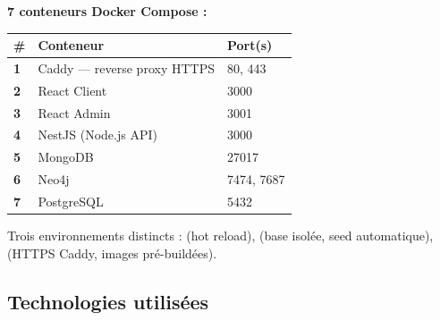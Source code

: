 \documentclass[12pt,a4paper]{article}
\begin{document}
\vspace{6pt}

\textbf{7 conteneurs Docker Compose :}

\vspace{4pt}
\begin{center}
    \renewcommand{\arraystretch}{1.4}
    \begin{tabularx}{\linewidth}{>{\bfseries}l X l}
        \textbf{\#} & \textbf{Conteneur}          & \textbf{Port(s)} \\
        \midrule
        \rowcolor{rowalt}
        1           & Caddy — reverse proxy HTTPS & 80, 443          \\
        2           & React Client                & 3000             \\
        \rowcolor{rowalt}
        3           & React Admin                 & 3001             \\
        4           & NestJS (Node.js API)        & 3000             \\
        \rowcolor{rowalt}
        5           & MongoDB                     & 27017            \\
        6           & Neo4j                       & 7474, 7687       \\
        \rowcolor{rowalt}
        7           & PostgreSQL                  & 5432             \\
    \end{tabularx}
\end{center}

\vspace{4pt}

Trois environnements distincts :  (hot reload),  (base isolée,
seed automatique),  (HTTPS Caddy, images pré-buildées).

\newpage

\subsection{Technologies utilisées}
\end{document}
